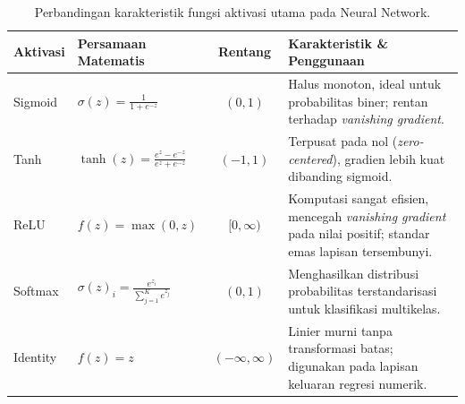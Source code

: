 \documentclass[a4paper,oneside,12pt]{report}
\begin{document}
\begin{table}[H]
	\centering
	\caption{Perbandingan karakteristik fungsi aktivasi utama pada Neural Network.}
	\label{tab:fungsi-aktivasi}
	\small
	\begin{tabularx}{\linewidth}{|l|>{\raggedright\arraybackslash}X|c|>{\raggedright\arraybackslash}X|}
		\hline
		\textbf{Aktivasi} & \textbf{Persamaan Matematis}                         & \textbf{Rentang}    & \textbf{Karakteristik \& Penggunaan}                                                                                 \\
		\hline
		Sigmoid           & $\sigma(z) = \frac{1}{1 + e^{-z}}$                   & $(0, 1)$            & Halus monoton, ideal untuk probabilitas biner; rentan terhadap \textit{vanishing gradient}.                          \\
		\hline
		Tanh              & $\tanh(z) = \frac{e^z - e^{-z}}{e^z + e^{-z}}$       & $(-1, 1)$           & Terpusat pada nol (\textit{zero-centered}), gradien lebih kuat dibanding sigmoid.                                    \\
		\hline
		ReLU              & $f(z) = \max(0, z)$                                  & $[0, \infty)$       & Komputasi sangat efisien, mencegah \textit{vanishing gradient} pada nilai positif; standar emas lapisan tersembunyi. \\
		\hline
		Softmax           & $\sigma(z)_i = \frac{e^{z_i}}{\sum_{j=1}^K e^{z_j}}$ & $(0, 1)$            & Menghasilkan distribusi probabilitas terstandarisasi untuk klasifikasi multikelas.                                   \\
		\hline
		Identity          & $f(z) = z$                                           & $(-\infty, \infty)$ & Linier murni tanpa transformasi batas; digunakan pada lapisan keluaran regresi numerik.                              \\
		\hline
	\end{tabularx}
\end{table}
\end{document}
